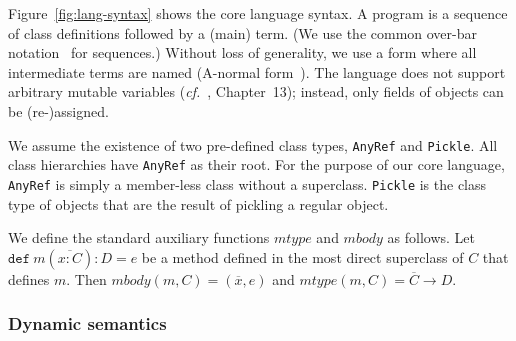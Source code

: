 \documentclass[10pt]{sigplanconf}
\theoremstyle{definition}
\theoremstyle{definition}
\newcommand{\ba}{\begin{array}}
\newcommand{\ea}{\end{array}}
\newcommand{\typ}{:}
\newcommand{\seq}[1]{\overline{#1}}
\begin{document}
Figure~\ref{fig:lang-syntax} shows the core language syntax. A program is a
sequence of class definitions followed by a (main) term. (We use the common
over-bar notation~\cite{Igarashi2001} for sequences.) Without loss of
generality, we use a form where all intermediate terms are named (A-normal
form~\cite{Flanagan93}). The language does not support arbitrary mutable
variables ({\em cf.}~\cite{TAPL}, Chapter~13); instead, only fields of objects
can be (re-)assigned.

We assume the existence of two pre-defined class types, \verb|AnyRef| and
\verb|Pickle|. All class hierarchies have \verb|AnyRef| as their root. For the
purpose of our core language, \verb|AnyRef| is simply a member-less class
without a superclass. \verb|Pickle| is the class type of objects that are the
result of pickling a regular object.

We define the standard auxiliary functions $mtype$ and $mbody$ as follows.
Let $\texttt{def}~m(\seq{x \typ C}) \typ D = e$ be a method defined in the
most direct superclass of $C$ that defines $m$. Then
$mbody(m, C) = (\seq{x}, e)$ and $mtype(m, C) = \seq{C} \rightarrow D$.

\vspace{0em}
\subsubsection{Dynamic semantics}

\end{document}
